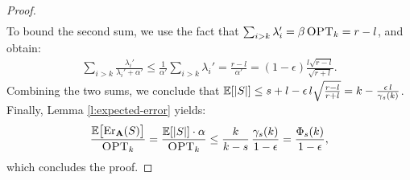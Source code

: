 \documentclass{article}
\begin{document}
\begin{proof}
\begin{align}
  \end{align}
To bound the second sum, we use  the fact that
$\sum_{i>k}\lambda_i'=\beta\,{\textsc{OPT}_k}=r-l$, and obtain:
  \begin{align}
    \sum_{i>k}\frac{\lambda_i'}{\lambda_i'+\alpha'}
    \le \frac1{\alpha'} \sum_{i>k} \lambda_i' 
 = \frac{r-l}{\alpha'}
=                  (1-\epsilon)\frac{l\sqrt{r-l}}{\sqrt{r+l}}.\label{eq:sum2}
  \end{align}
Combining the two sums, we conclude that $\mathbb E[|S|]\leq s+l - \epsilon\,l
\sqrt{\tfrac{r-l}{r+l}}=k-\frac{\epsilon\,l}{\gamma_s(k)}$. Finally, Lemma \ref{l:expected-error} yields:
    \begin{align*}
      \frac{\mathbb E\big[\mathrm{Er}_\mathbf A(S)\big]}{{\textsc{OPT}_k}} = \frac{\mathbb E[|S|]\cdot\alpha}{{\textsc{OPT}_k}}\leq
\frac{k}{k-s}\,\frac{\gamma_s(k)}{1-\epsilon} = \frac{\Phi_s(k)}{1-\epsilon},
    \end{align*}
    which concludes the proof.
  \end{proof}
\end{document}
